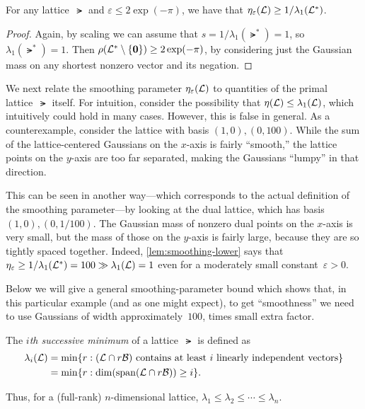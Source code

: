 \documentclass[11pt]{article}
\begin{document}
\begin{lemma}
  \label{lem:smoothing-lower}
  For any lattice~$\lat$ and $\varepsilon \leq 2\exp(-\pi)$, we have
  that $\eta_\varepsilon(\mathcal{L}) \geq 1/\lambda_1(\mathcal{L}^*)$.
\end{lemma}

\begin{proof}
  Again, by scaling we can assume that $s = 1/\lambda_1(\lat^*) = 1$,
  so $\lambda_{1}(\lat^{*}) = 1$. Then
  $\rho(\mathcal{L}^* \setminus \{\mathbf{0}\}) \geq 2 \exp(-\pi)$, by
  considering just the Gaussian mass on any shortest nonzero vector
  and its negation.
\end{proof}

We next relate the smoothing parameter $\eta_{\varepsilon}(\mathcal{L})$
to quantities of the primal lattice~$\lat$ itself. For intuition,
consider the possibility that $\eta(\mathcal{L}) \leq \lambda_1(\mathcal{L})$,
which intuitively could hold in many cases. However, this is false in
general. As a counterexample, consider the lattice with basis
$(1,0), (0,100)$. While the sum of the lattice-centered Gaussians on
the $x$-axis is fairly ``smooth,'' the lattice points on the $y$-axis
are too far separated, making the Gaussians ``lumpy'' in that
direction.

This can be seen in another way---which corresponds to the actual
definition of the smoothing parameter---by looking at the dual
lattice, which has basis $(1,0), (0,1/100)$. The Gaussian mass of
nonzero dual points on the $x$-axis is very small, but the mass of
those on the $y$-axis is fairly large, because they are so tightly
spaced together. Indeed, \cref{lem:smoothing-lower} says that
$\eta_{\varepsilon} \geq 1/\lambda_{1}(\mathcal{L}^{*}) = 100 \gg
\lambda_{1}(\mathcal{L}) = 1$ even for a moderately small
constant~$\varepsilon > 0$.

Below we will give a general smoothing-parameter bound which shows
that, in this particular example (and as one might expect), to get
``smoothness'' we need to use Gaussians of width approximately~$100$,
times small extra factor.

\begin{definition}
  \label{def:successive-minimum}
  The \emph{$i$th successive minimum} of a
  lattice~$\lat$ is defined as
  \begin{align*}
    \lambda_i(\mathcal{L})
    &= \min \{r : (\mathcal{L} \cap r\mathcal{B}) \text{
      contains at least~$i$ linearly independent vectors}\} \\
    &= \min \{r : \dim(\operatorname{span}(\mathcal{L} \cap r\mathcal{B})) \geq i\} .
  \end{align*}
\end{definition}
Thus, for a (full-rank) $n$-dimensional lattice,
$\lambda_1 \leq \lambda_2 \leq \cdots \leq \lambda_n$.
\end{document}
